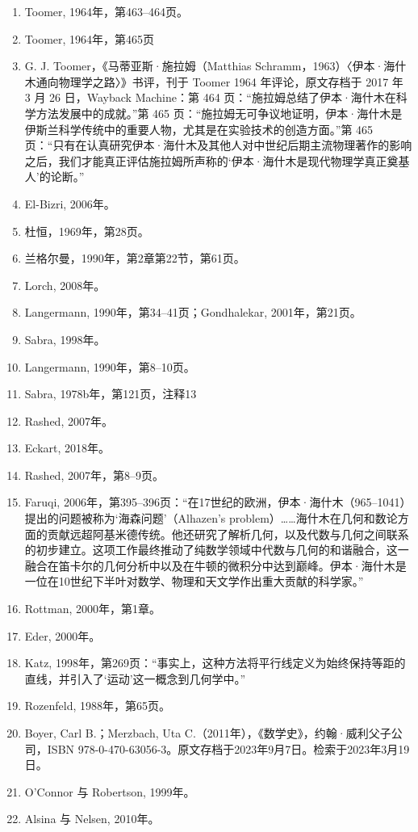 \begin{enumerate}
\item Toomer, 1964年，第463–464页。
\item Toomer, 1964年，第465页
\item G. J. Toomer，《马蒂亚斯·施拉姆（Matthias Schramm，1963）〈伊本·海什木通向物理学之路〉》书评，刊于 Toomer 1964 年评论，原文存档于 2017 年 3 月 26 日，Wayback Machine：第 464 页：“施拉姆总结了伊本·海什木在科学方法发展中的成就。”第 465 页：“施拉姆无可争议地证明，伊本·海什木是伊斯兰科学传统中的重要人物，尤其是在实验技术的创造方面。”第 465 页：“只有在认真研究伊本·海什木及其他人对中世纪后期主流物理著作的影响之后，我们才能真正评估施拉姆所声称的‘伊本·海什木是现代物理学真正奠基人’的论断。”
\item El-Bizri, 2006年。
\item 杜恒，1969年，第28页。
\item 兰格尔曼，1990年，第2章第22节，第61页。
\item Lorch, 2008年。
\item Langermann, 1990年，第34–41页；Gondhalekar, 2001年，第21页。
\item Sabra, 1998年。
\item Langermann, 1990年，第8–10页。
\item Sabra, 1978b年，第121页，注释13
\item Rashed, 2007年。
\item Eckart, 2018年。
\item Rashed, 2007年，第8–9页。
\item Faruqi, 2006年，第395–396页：“在17世纪的欧洲，伊本·海什木（965–1041）提出的问题被称为‘海森问题’（Alhazen's problem）……海什木在几何和数论方面的贡献远超阿基米德传统。他还研究了解析几何，以及代数与几何之间联系的初步建立。这项工作最终推动了纯数学领域中代数与几何的和谐融合，这一融合在笛卡尔的几何分析中以及在牛顿的微积分中达到巅峰。伊本·海什木是一位在10世纪下半叶对数学、物理和天文学作出重大贡献的科学家。”
\item Rottman, 2000年，第1章。
\item Eder, 2000年。
\item Katz, 1998年，第269页：“事实上，这种方法将平行线定义为始终保持等距的直线，并引入了‘运动’这一概念到几何学中。”
\item Rozenfeld, 1988年，第65页。
\item Boyer, Carl B.；Merzbach, Uta C.（2011年），《数学史》，约翰·威利父子公司，ISBN 978-0-470-63056-3。原文存档于2023年9月7日。检索于2023年3月19日。
\item O'Connor 与 Robertson, 1999年。
\item Alsina 与 Nelsen, 2010年。

\end{enumerate}
